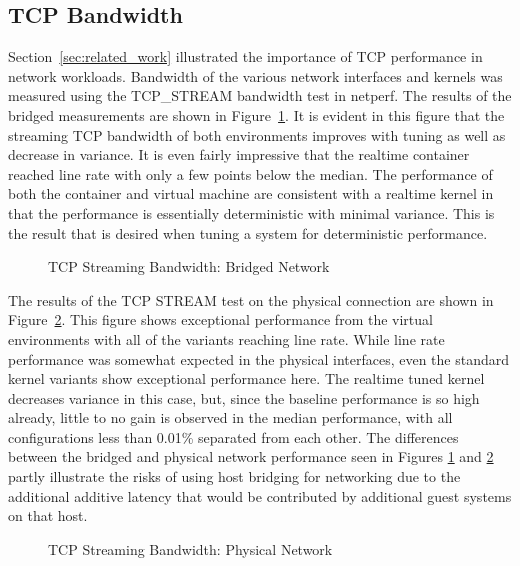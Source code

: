 \subsection{TCP Bandwidth} %
\label{sub:tcpbandwidth}
Section~\ref{sec:related_work} illustrated the importance of TCP performance in network workloads.
Bandwidth of the various network interfaces and kernels was measured using the TCP\_STREAM bandwidth test in netperf.
The results of the bridged measurements are shown in Figure~\ref{fig:tcp_stream_bridge}. 
It is evident in this figure that the streaming TCP bandwidth of both environments improves with tuning as well as decrease in variance.  
It is even fairly impressive that the realtime container reached line rate with only a few points below the median.  
The performance of both the container and virtual machine are consistent with a realtime kernel in that the performance is essentially deterministic with minimal variance.
This is the result that is desired when tuning a system for deterministic performance.

\begin{figure}
    \centering
    \def\svgwidth{\columnwidth}
    
    \caption{TCP Streaming Bandwidth: Bridged Network}
    \label{fig:tcp_stream_bridge}
\end{figure}

The results of the TCP STREAM test on the physical connection are shown in Figure~\ref{fig:tcp_stream_phys}.
This figure shows exceptional performance from the virtual environments with all of the variants reaching line rate.
While line rate performance was somewhat expected in the physical interfaces, even the standard kernel variants show exceptional performance here.
The realtime tuned kernel decreases variance in this case, but, since the baseline performance is so high already, little to no gain is observed in the median performance, with all configurations less than 0.01\% separated from each other.  
The differences between the bridged and physical network performance seen in Figures \ref{fig:tcp_stream_bridge} and \ref{fig:tcp_stream_phys} partly illustrate the risks of using host bridging for networking due to the additional additive latency that would be contributed by additional guest systems on that host.  

\begin{figure}
    \centering
    \def\svgwidth{\columnwidth}
    
    \caption{TCP Streaming Bandwidth: Physical Network}
    \label{fig:tcp_stream_phys}
\end{figure}

